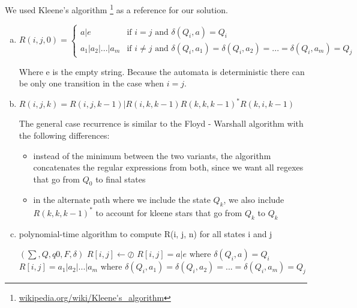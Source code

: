 
We used Kleene's algorithm \footnote{\url{wikipedia.org/wiki/Kleene's_algorithm}} as a reference for our solution.

\begin{enumerate}[(a)]


\item
\[ 
	R(i,j,0) = 
  \begin{cases} 
      a | e & \text{if } i = j \text{ and } \delta(Q_{i}, a) = Q_{i} \\
      a_{1} | a_{2} | ... | a_{m} & \text{if } i \neq j \text{ and } \delta(Q_{i}, a_{1}) = \delta(Q_{i}, a_{2}) = ...  = \delta(Q_{i}, a_{m}) = Q_{j}
   \end{cases}
\]

Where e is the empty string.
Because the automata is deterministic there can be only one transition in the case when $i = j$.

\item 

$R(i,j,k)	= R(i,j,k-1) | R(i, k, k - 1)R(k,k,k-1)^{*}R(k,i,k-1)$

The general case recurrence is similar to the Floyd - Warshall algorithm with the following differences:


\begin{itemize}
	\item instead of the minimum between the two variants, the algorithm concatenates the regular expressions from both, since we want all regexes that go from $Q_{0}$ to final states
	\item in the alternate path where we include the state $Q_{k}$, we also include $R(k,k,k-1)^{*}$ to account for kleene stars that go from $Q_{k}$ to $Q_{k}$
\end{itemize}

\item

\begin{algorithm}[H]
	\caption{polynomial-time algorithm to compute R(i, j, n) for all states i and j}
	\begin{algorithmic}
	  \Require {}
	  \Require $(\sum, Q, q0, F, \delta)$
				\State $R[i,j] \gets \oslash$
					\State $R[i,j]= a | e \text{ where } \delta(Q_{i}, a) = Q_{i} $
				\Else
					 \State $R[i,j] = a_{1} | a_{2} | ... | a_{m}  \text{ where } \delta(Q_{i}, a_{1}) = \delta(Q_{i}, a_{2}) = ...  = \delta(Q_{i}, a_{m}) = Q_{j}$
				\EndIf
			\EndFor
		\EndFor
		

\end{algorithmic}
\end{algorithm}
\end{enumerate}
